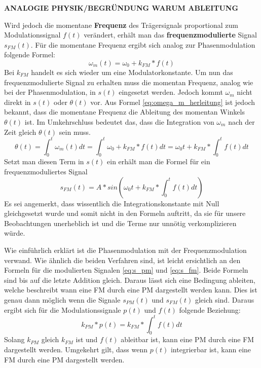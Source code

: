 \textbf{ANALOGIE PHYSIK/BEGRÜNDUNG WARUM ABLEITUNG}

Wird jedoch die momentane \textbf{Frequenz} des Trägersignals proportional zum Modulationssignal \(f(t)\) verändert, erhält man das \textbf{frequenzmodulierte} Signal \(s_{FM}(t)\). Für die momentane Frequenz ergibt sich analog zur Phasenmodulation folgende Formel:
\[
\omega_m(t)=\omega_0+k_{FM}*f(t)
\]
Bei \(k_{FM}\) handelt es sich wieder um eine Modulatorkonstante. Um nun das frequenzmodulierte Signal zu erhalten muss die momentan Frequenz, analog wie bei der Phasenmodulation, in \(s(t)\) eingesetzt werden. Jedoch kommt \(\omega_m\) nicht direkt in \(s(t)\) oder \(\theta(t)\) vor. Aus Formel \ref{eq:omega_m_herleitung} ist jedoch bekannt, dass die momentane Frequenz die Ableitung des momentan Winkels \(\theta(t)\) ist. Im Umkehrschluss bedeutet das, dass die Integration von \(\omega_m\) nach der Zeit gleich \(\theta(t)\) sein muss.
\begin{equation*}
\theta(t)=\int_0^t{\omega_m(t)} dt = \int_0^t{\omega_0 + k_{FM}*f(t)} dt = \omega_0t + k_{FM} * \int_0^t{f(t)} dt
\end{equation*}
Setzt man diesen Term in \(s(t)\) ein erhält man die Formel für ein frequenzmoduliertes Signal
\begin{equation}
s_{FM}(t)=A*sin(\omega_0t + k_{FM} * \int_0^t{f(t)} dt)
\label{eq:s_fm}
\end{equation}
Es sei angemerkt, dass wissentlich die Integrationskonstante mit Null gleichgesetzt wurde und somit nicht in den Formeln auftritt, da sie für unsere Beobachtungen unerheblich ist und die Terme nur unnötig verkomplizieren würde.

Wie einführlich erklärt ist die Phasenmodulation mit der Frequenzmodulation verwand. Wie ähnlich die beiden Verfahren sind, ist leicht ersichtlich an den Formeln für die modulierten Signalen \ref{eq:s_pm} und \ref{eq:s_fm}. Beide Formeln sind bis auf die letzte Addition gleich. Daraus lässt sich eine Bedingung ableiten, welche beschreibt wann eine FM durch eine PM dargestellt werden kann. Dies ist genau dann möglich wenn die Signale \(s_{PM}(t)\) und \(s_{FM}(t)\) gleich sind. Daraus ergibt sich für die Modulationssignale \(p(t)\) und \(f(t)\) folgende Beziehung:
\begin{equation}
k_{PM}*p(t)=k_{FM} * \int_0^t{f(t)} dt
\end{equation}
Solang \(k_{PM}\) gleich \(k_{FM}\) ist und \(f(t)\) ableitbar ist, kann eine PM durch eine FM dargestellt werden. Umgekehrt gilt, dass wenn \(p(t)\) integrierbar ist, kann eine FM durch eine PM dargestellt werden.

